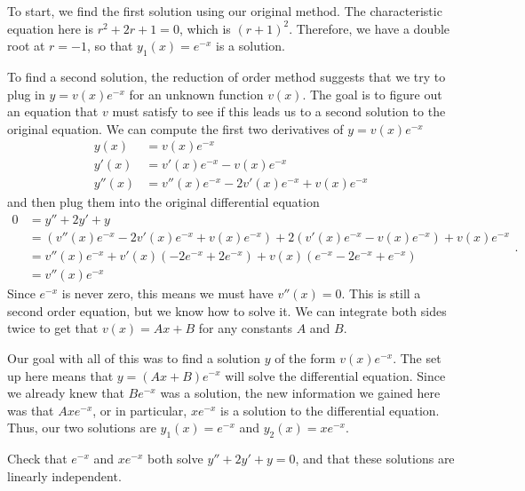 \begin{exampleSol}
To start, we find the first solution using our original method. The characteristic equation here is $r^2 + 2r + 1 = 0$, which is $(r+1)^2$. Therefore, we have a double root at $r=-1$, so that $y_1(x) = e^{-x}$ is a solution.

To find a second solution, the reduction of order method suggests that we try to plug in $y = v(x)e^{-x}$ for an unknown function $v(x)$. The goal is to figure out an equation that $v$ must satisfy to see if this leads us to a second solution to the original equation. We can compute the first two derivatives of $y = v(x) e^{-x}$ 
\begin{equation*}
\begin{split}
y(x) &= v(x)e^{-x} \\
y'(x) &= v'(x)e^{-x} - v(x)e^{-x} \\
y''(x) &= v''(x)e^{-x} - 2v'(x)e^{-x} + v(x)e^{-x} 
\end{split}
\end{equation*}
and then plug them into the original differential equation
\begin{equation*}
\begin{split}
0 &= y'' + 2y' + y \\
&= (v''(x)e^{-x} - 2v'(x)e^{-x} + v(x)e^{-x}) + 2(v'(x)e^{-x} - v(x)e^{-x}) + v(x)e^{-x} \\
&= v''(x)e^{-x} + v'(x)(-2e^{-x}+2e^{-x}) + v(x)(e^{-x} - 2e^{-x} + e^{-x}) \\
&= v''(x)e^{-x}
\end{split}.
\end{equation*}
Since $e^{-x}$ is never zero, this means we must have $v''(x) = 0$. This is still a second order equation, but we know how to solve it. We can integrate both sides twice to get that $v(x) = Ax + B$ for any constants $A$ and $B$. 

Our goal with all of this was to find a solution $y$ of the form $v(x)e^{-x}$. The set up here means that $y = (Ax + B)e^{-x}$ will solve the differential equation. Since we already knew that $Be^{-x}$ was a solution, the new information we gained here was that $Axe^{-x}$, or in particular, $xe^{-x}$ is a solution to the differential equation. Thus, our two solutions are $y_1(x) = e^{-x}$ and $y_2(x) = xe^{-x}$. 
\end{exampleSol}

\begin{exercise}
Check that $e^{-x}$ and $xe^{-x}$ both solve $y'' + 2y' + y = 0$, and that these solutions are linearly independent.
\end{exercise}

